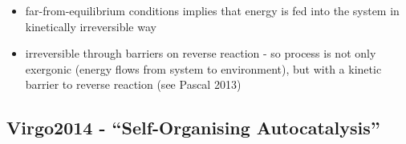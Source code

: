 		\begin{itemize}
			\item
			
			far-from-equilibrium conditions implies that energy is fed into the
			system in kinetically irreversible way
			
			\item
			
			irreversible through barriers on reverse reaction - so process is not
			only exergonic (energy flows from system to environment), but with a
			kinetic barrier to reverse reaction (see Pascal 2013)
			
		\end{itemize}
		
		\hypertarget{virgo2014---self-organising-autocatalysis}{\subsection{Virgo2014
				- ``Self-Organising
				Autocatalysis''}\label{virgo2014---self-organising-autocatalysis}}
		
